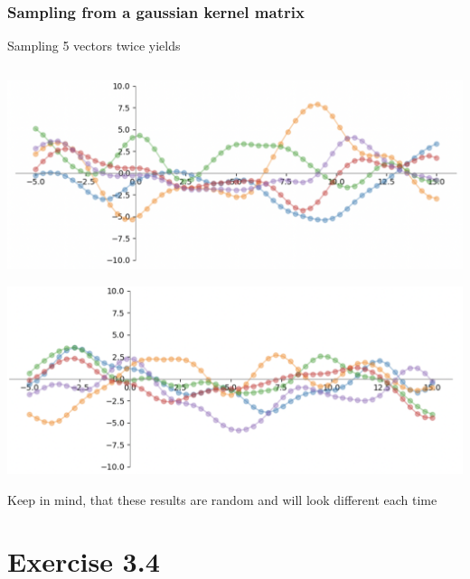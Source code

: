 \documentclass[10pt,aspectratio=169,handout]{beamer}
\begin{document}
\begin{frame}
    \frametitle{Sampling from a gaussian kernel matrix}

    Sampling 5 vectors twice yields

    \inputminted[bgcolor=LightGray,fontsize=\small]{python}{code/gaussian_sampling.py}

    \begin{minipage}{0.49\textwidth}
        \includegraphics[width=\textwidth]{images/ex3.3.2a.png}
    \end{minipage}
    \begin{minipage}{0.49\textwidth}
        \includegraphics[width=\textwidth]{images/ex3.3.2b.png}
    \end{minipage}

    Keep in mind, that these results are random and will look different each time

\end{frame}

\section{Exercise 3.4}
\end{document}
